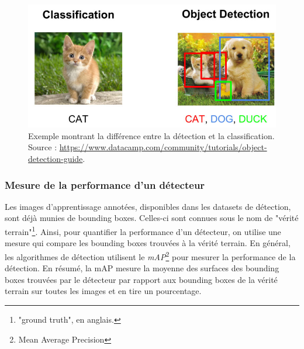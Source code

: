 \begin{figure}[!h]
\centering
\includegraphics[scale=0.5]{img/Classi-vs-detect.PNG}
\caption{Exemple montrant la différence entre la détection et la classification. Source : \url{https://www.datacamp.com/community/tutorials/object-detection-guide}.}
\label{fig:class-vs-detec}
\end{figure}

\subsubsection*{Mesure de la performance d'un détecteur}
Les images d'apprentissage annotées, disponibles dans les datasets de détection, sont déjà munies de bounding boxes. Celles-ci sont connues sous le nom de "vérité terrain"\footnote{"ground truth", en anglais.}. Ainsi, pour quantifier la performance d'un détecteur, on utilise une mesure qui compare les bounding boxes trouvées à la vérité terrain. En général, les algorithmes de détection utilisent le \textit{mAP}\footnote{Mean Average Precision} \cite{hui_2018} pour mesurer la performance de la détection. En résumé, la mAP mesure la moyenne des surfaces des bounding boxes trouvées par le détecteur par rapport aux bounding boxes de la vérité terrain sur toutes les images et en tire un pourcentage.

